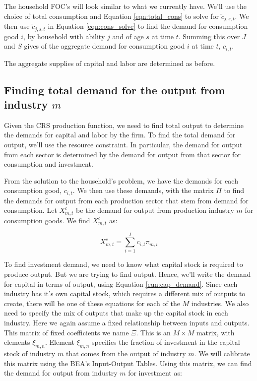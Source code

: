\documentclass[letterpaper,12pt]{article}
\theoremstyle{definition}
\begin{document}
The household FOC's will look similar to what we currently have. We'll use the choice of total consumption and Equation \ref{eqn:total_cons} to solve for $\tilde{c}_{j,s,t}$.  We then use $\tilde{c}_{j,s,t}$ in Equation \ref{eqn:cons_solve} to find the demand for consumption good $i$, by household with ability $j$ and of age $s$ at time $t$.  Summing this over $J$ and $S$ gives of the aggregate demand for consumption good $i$ at time $t$, $c_{i,t}$. 

The aggregate supplies of capital and labor are determined as before.

\subsection*{Finding total demand for the output from industry $m$}

Given the CRS production function, we need to find total output to determine the demands for capital and labor by the firm.  To find the total demand for output, we'll use the resource constraint.  In particular, the demand for output from each sector is determined by the demand for output from that sector for consumption and investment.

From the solution to the household's problem, we have the demands for each consumption good, $c_{i,t}$.  We then use these demands, with the matrix $\Pi$ to find the demands for output from each production sector that stem from demand for consumption.  Let $X^{c}_{m,t}$ be the demand for output from production industry $m$ for consumption goods.  We find $X^{c}_{m,t}$ as:

\begin{equation}
X^{c}_{m,t}= \sum_{i=1}^{I} c_{i,t}\pi_{m,i}
\end{equation} 

To find investment demand, we need to know what capital stock is required to produce output.  But we are trying to find output. Hence, we'll write the demand for capital in terms of output, using Equation \ref{eqn:cap_demand}.  Since each industry has it's own capital stock, which requires a different mix of outputs to create, there will be one of these equations for each of the $M$ industries.  We also need to specify the mix of outputs that make up the capital stock in each industry.  Here we again assume a fixed relationship between inputs and outputs. This matrix of fixed coefficients we name $\Xi$.  This is an $M\times M$ matrix, with elements $\xi_{m,n}$.  Element $\xi_{m,n}$ specifies the fraction of investment in the capital stock of industry $m$ that comes from the output of industry $m$. We will calibrate this matrix using the BEA's Input-Output Tables.  Using this matrix, we can find the demand for output from industry $m$ for investment as:
\end{document}
